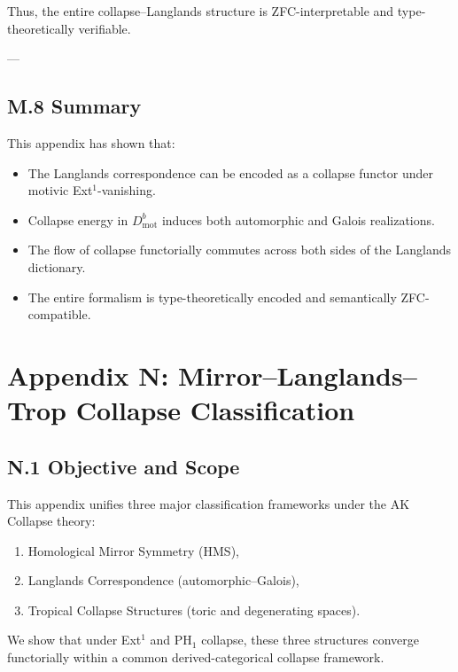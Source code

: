 \documentclass[11pt]{article}
\begin{document}
Thus, the entire collapse–Langlands structure is ZFC-interpretable and type-theoretically verifiable.

---

\subsection*{M.8 Summary}

This appendix has shown that:
\begin{itemize}
  \item The Langlands correspondence can be encoded as a collapse functor under motivic Ext$^1$-vanishing.
  \item Collapse energy in $D^b_{\mathrm{mot}}$ induces both automorphic and Galois realizations.
  \item The flow of collapse functorially commutes across both sides of the Langlands dictionary.
  \item The entire formalism is type-theoretically encoded and semantically ZFC-compatible.
\end{itemize}




\section*{Appendix N: Mirror–Langlands–Trop Collapse Classification}

\subsection*{N.1 Objective and Scope}

This appendix unifies three major classification frameworks under the AK Collapse theory:

\begin{enumerate}
  \item Homological Mirror Symmetry (HMS),
  \item Langlands Correspondence (automorphic–Galois),
  \item Tropical Collapse Structures (toric and degenerating spaces).
\end{enumerate}

We show that under Ext$^1$ and PH$_1$ collapse, these three structures converge functorially within a common derived-categorical collapse framework.
\end{document}
